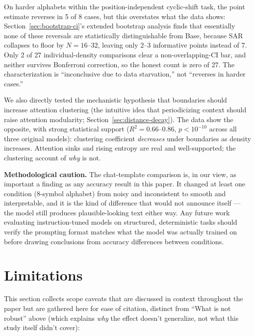 \documentclass[11pt]{article}
\begin{document}
On harder alphabets within the position-independent cyclic-shift task, the point estimate reverses in 5 of 8 cases, but this overstates what the data shows: Section~\ref{sec:bootstrap-ci}'s extended bootstrap analysis finds that essentially none of these reversals are statistically distinguishable from Base, because SAR collapses to floor by $N=16$--$32$, leaving only 2--3 informative points instead of 7. Only 2 of 27 individual-density comparisons clear a non-overlapping-CI bar, and neither survives Bonferroni correction, so the honest count is zero of 27. The characterization is ``inconclusive due to data starvation,'' not ``reverses in harder cases.''

We also directly tested the mechanistic hypothesis that boundaries should increase attention clustering (the intuitive idea that periodicizing context should raise attention modularity; Section~\ref{sec:distance-decay}). The data show the opposite, with strong statistical support ($R^2 = 0.66$--$0.86$, $p < 10^{-10}$ across all three original models): clustering coefficient \emph{decreases} under boundaries as density increases. Attention sinks and rising entropy are real and well-supported; the clustering account of \emph{why} is not.

\textbf{Methodological caution.} The chat-template comparison is, in our view, as important a finding as any accuracy result in this paper. It changed at least one condition (8-symbol alphabet) from noisy and inconsistent to smooth and interpretable, and it is the kind of difference that would not announce itself --- the model still produces plausible-looking text either way. Any future work evaluating instruction-tuned models on structured, deterministic tasks should verify the prompting format matches what the model was actually trained on before drawing conclusions from accuracy differences between conditions.

\section{Limitations}

This section collects scope caveats that are discussed in context throughout the paper but are gathered here for ease of citation, distinct from ``What is not robust'' above (which explains \emph{why} the effect doesn't generalize, not what this study itself didn't cover):
\end{document}

